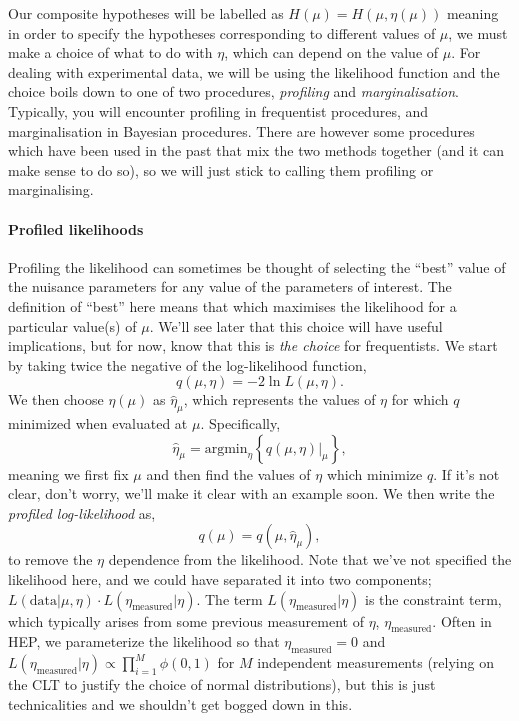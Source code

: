 Our composite hypotheses will be labelled as $H(\mu)=H\left(\mu,\eta(\mu)\right)$ meaning in order to specify the hypotheses corresponding to different values of $\mu$, we must make a choice of what to do with $\eta$, which can depend on the value of $\mu$. For dealing with experimental data, we will be using the likelihood function
and the choice boils down to one of two procedures, \emph{profiling} and \emph{marginalisation}. Typically, you will encounter profiling in frequentist procedures, and marginalisation in Bayesian procedures. There are however some procedures which have been used in the past that mix the two methods together (and it can make sense to do so), so we will just stick to calling them profiling or marginalising.

\paragraph{Profiled likelihoods}
Profiling the likelihood can sometimes be thought of selecting the ``best'' value of the nuisance parameters for any value of the parameters of interest. The definition of ``best'' here means that which maximises the likelihood for a particular value(s) of $\mu$. We'll see later that this choice will have useful implications, but for now, know that this is \emph{the choice} for frequentists. We start by taking twice the negative of the log-likelihood function,
\begin{equation}
    q(\mu,\eta)= -2\ln L(\mu,\eta).
\end{equation}
We then choose $\eta(\mu)$ as $\hat{\eta}_{\mu}$, which represents the values of $\eta$ for which $q$  minimized when evaluated at $\mu$. Specifically,
\begin{equation}
\hat{\eta}_{\mu} = \mathrm{arg min}_{\eta}\left\{q(\mu,\eta)\biggr|_{\mu}\right\},
\end{equation}
meaning we first fix $\mu$ and then find the values of $\eta$ which minimize $q$. If it's not clear, don't worry, we'll make it clear with an example soon. We then write the \emph{profiled log-likelihood} as,
\begin{equation}
q(\mu) = q(\mu,\hat{\eta}_{\mu}),
\end{equation}
to remove the $\eta$ dependence from the likelihood. Note that we've not specified the likelihood here, and we could have separated it into two components; $L(\mathrm{data}|\mu,\eta)\cdot L(\eta_{\mathrm{measured}}|\eta)$. The term $L(\eta_{\mathrm{measured}}|\eta)$ is the constraint term, which typically arises from some previous measurement of $\eta$, $\eta_{\mathrm{measured}}$. Often in HEP, we parameterize the likelihood so that $\eta_{\mathrm{measured}}=0$ and $L(\eta_{\mathrm{measured}}|\eta)\propto \prod_{i=1}^{M}\phi(0,1)$ for $M$ independent measurements (relying on the CLT to justify the choice of normal distributions), but this is just technicalities and we shouldn't get bogged down in this.

